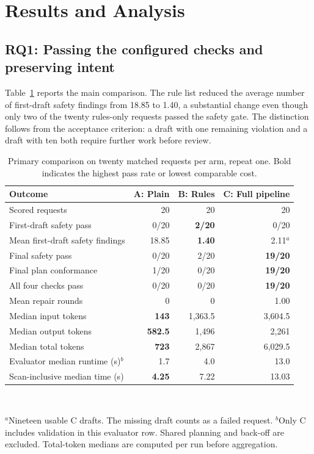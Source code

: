 \documentclass[12pt,onecolumn,draftclsnofoot]{IEEEtran}
\begin{document}
\section{Results and Analysis}
\subsection{RQ1: Passing the configured checks and preserving intent}
Table~\ref{tab:main} reports the main comparison. The rule list reduced the average number of first-draft safety findings from 18.85 to 1.40, a substantial change even though only two of the twenty rules-only requests passed the safety gate. The distinction follows from the acceptance criterion: a draft with one remaining violation and a draft with ten both require further work before review.
\begin{table}[htbp]\centering
\caption{Primary comparison on twenty matched requests per arm, repeat one. Bold indicates the highest pass rate or lowest comparable cost.}
\label{tab:main}\small
\begin{tabular}{@{}lrrr@{}}\toprule
Outcome & A: Plain & B: Rules & C: Full pipeline\\\midrule
Scored requests & 20 & 20 & 20\\
First-draft safety pass & 0/20 & \textbf{2/20} & 0/20\\
Mean first-draft safety findings & 18.85 & \textbf{1.40} & 2.11$^{a}$\\
Final safety pass & 0/20 & 2/20 & \textbf{19/20}\\
Final plan conformance & 1/20 & 0/20 & \textbf{19/20}\\
All four checks pass & 0/20 & 0/20 & \textbf{19/20}\\
Mean repair rounds & 0 & 0 & 1.00\\
Median input tokens & \textbf{143} & 1,363.5 & 3,604.5\\
Median output tokens & \textbf{582.5} & 1,496 & 2,261\\
Median total tokens & \textbf{723} & 2,867 & 6,029.5\\
Evaluator median runtime (s)$^{b}$ & 1.7 & 4.0 & 13.0\\
Scan-inclusive median time (s) & \textbf{4.25} & 7.22 & 13.03\\\bottomrule
\end{tabular}\\[-1pt]
\begin{minipage}{.94\linewidth}\footnotesize
$^{a}$Nineteen usable C drafts. The missing draft counts as a failed request.
$^{b}$Only C includes validation in this evaluator row. Shared planning and back-off are excluded. Total-token medians are computed per run before aggregation.
\end{minipage}
\end{table}
\end{document}
